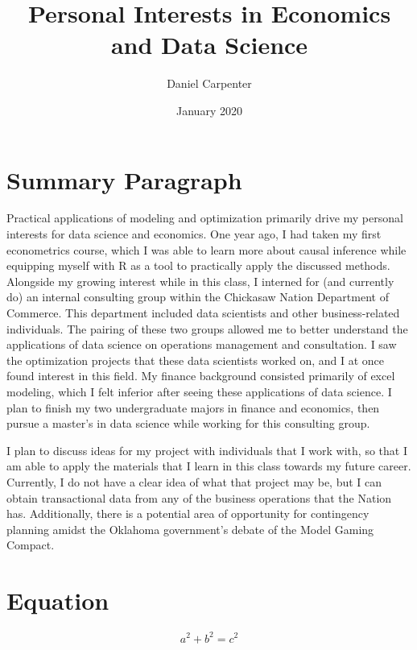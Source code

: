 \documentclass{article}
\title{Personal Interests in Economics and Data Science}
\author{Daniel Carpenter}
\date{January 2020}
\begin{document}
\maketitle

\section{Summary Paragraph}

Practical applications of modeling and optimization primarily drive my personal interests for data science and economics. One year ago, I had taken my first econometrics course, which I was able to learn more about causal inference while equipping myself with R as a tool to practically apply the discussed methods. Alongside my growing interest while in this class, I interned for (and currently do) an internal consulting group within the Chickasaw Nation Department of Commerce. This department included data scientists and other business-related individuals. The pairing of these two groups allowed me to better understand the applications of data science on operations management and consultation. I saw the optimization projects that these data scientists worked on, and I at once found interest in this field. My finance background consisted primarily of excel modeling, which I felt inferior after seeing these applications of data science. I plan to finish my two undergraduate majors in finance and economics, then pursue a master’s in data science while working for this consulting group.

I plan to discuss ideas for my project with individuals that I work with, so that I am able to apply the materials that I learn in this class towards my future career. Currently, I do not have a clear idea of what that project may be, but I can obtain transactional data from any of the business operations that the Nation has. Additionally, there is a potential area of opportunity for contingency planning amidst the Oklahoma government’s debate of the Model Gaming Compact. 

\section{Equation}
\begin{equation}
    a^2 + b^2 = c^2
\end{equation}
\end{document}
